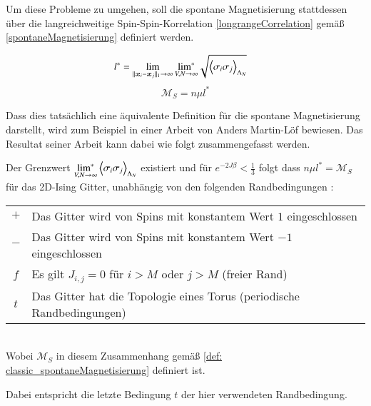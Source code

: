 \noindent Um diese Probleme zu umgehen, soll die spontane Magnetisierung stattdessen über die langreichweitige Spin-Spin-Korrelation \eqref{longrangeCorrelation} gemäß \eqref{spontaneMagnetisierung} definiert werden. 
\begin{grayframe}[frametitle = {Definition der spontanen Magnetisierung}]
\begin{align}
l^* & = \lim_{||\bm{x}_i-\bm{x}_j||_1 \rightarrow \infty} \underset{V,N \to \infty}{\text{lim}^{*}} \sqrt{\left\langle \sigma_i\sigma_j \right\rangle_{\Lambda_N}} \label{longrangeCorrelation} 
\end{align}
\begin{equation}
\mathcal{M}_S  = n \mu l^* \label{spontaneMagnetisierung}
\end{equation}
\end{grayframe}
\noindent Dass dies tatsächlich eine äquivalente Definition für die spontane Magnetisierung darstellt, wird zum Beispiel in einer Arbeit von Anders Martin-Löf \cite{Anders1969} bewiesen. Das Resultat seiner Arbeit kann dabei wie folgt zusammengefasst werden.
\begin{grayframe}[]
    Der Grenzwert $\underset{V,N \to \infty}{\text{lim}^{*}} \left\langle \sigma_i\sigma_j \right\rangle_{\Lambda_N}$ existiert und für $e^{-2J\beta}<\frac{1}{3}$ folgt dass $ n \mu l^{*} = \mathcal{M}_S$ für das 2D-Ising Gitter, unabhängig von den folgenden Randbedingungen :    \\
    
    \begin{tabular}{cl}
        $+$ & Das Gitter wird von Spins mit konstantem Wert $1$ eingeschlossen\\
        $-$ & Das Gitter wird von Spins mit konstantem Wert $-1$ eingeschlossen\\
        $f$ & Es gilt $J_{i,j} = 0$ für $i > M$ oder $j > M$ (freier Rand)\\
        $t$ & Das Gitter hat die Topologie eines Torus (periodische Randbedingungen) \\
    \end{tabular} \\ 

    \noindent Wobei $\mathcal{M}_S$ in diesem Zusammenhang gemäß \eqref{def: classic_spontaneMagnetisierung} definiert ist.
\end{grayframe}

\noindent Dabei entspricht die letzte Bedingung $t$ der hier verwendeten Randbedingung.





